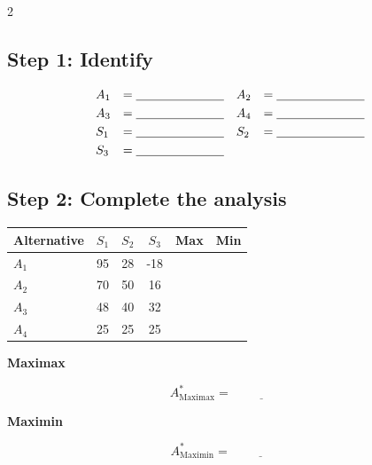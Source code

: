 \begin{multicols}{2}
		\subsection*{Step 1: Identify}
		
		\[
		\begin{array}{llll}
			A_1 &= \underline{\hspace{2.5cm}} &
			A_2 &= \underline{\hspace{2.5cm}} \\[3pt]
			A_3 &= \underline{\hspace{2.5cm}} &
			A_4 &= \underline{\hspace{2.5cm}} \\[3pt]
			S_1 &= \underline{\hspace{2.5cm}} &
			S_2 &= \underline{\hspace{2.5cm}} \\[3pt]
			S_3 &= \underline{\hspace{2.5cm}} &
			&
		\end{array}
		\]
		
		\subsection*{Step 2: Complete the analysis}
		
		\begin{center}
			\renewcommand{\arraystretch}{1.5}
			\small
			\begin{tabular}{lccccc}
				\toprule
				Alternative & $S_1$ & $S_2$ & $S_3$ & Max & Min \\
				\midrule
				$A_1$ & 95 & 28 & -18 &
				\underline{\hspace{1.1cm}} &
				\underline{\hspace{1.1cm}}\\[3pt]
				$A_2$ & 70 & 50 & 16 &
				\underline{\hspace{1.1cm}} &
				\underline{\hspace{1.1cm}}\\[3pt]
				$A_3$ & 48 & 40 & 32 &
				\underline{\hspace{1.1cm}} &
				\underline{\hspace{1.1cm}}\\[3pt]
				$A_4$ & 25 & 25 & 25 &
				\underline{\hspace{1.1cm}} &
				\underline{\hspace{1.1cm}}\\
				\bottomrule
			\end{tabular}
		\end{center}
		
		\textbf{Maximax}
		
		\[
		A^*_{\mathrm{Maximax}}
		=\underline{\hspace{2cm}}
		\]
		
		\textbf{Maximin}
		
		\[
		A^*_{\mathrm{Maximin}}
		=\underline{\hspace{2cm}}
		\]

		
	\end{multicols}
	
